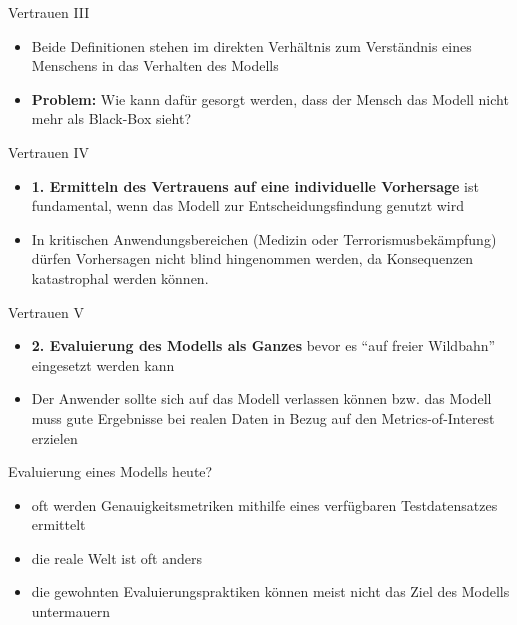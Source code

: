 \documentclass{beamer}
\begin{document}
  \begin{frame}{Vertrauen III}
    \begin{itemize}
      \item Beide Definitionen stehen im direkten Verhältnis zum Verständnis eines Menschens in das Verhalten des Modells
      \item \textbf{Problem:} Wie kann dafür gesorgt werden, dass der Mensch das Modell nicht mehr als Black-Box sieht?
    \end{itemize}
  \end{frame}

  \begin{frame}{Vertrauen IV}
    \begin{itemize}
      \item \textbf{1. Ermitteln des Vertrauens auf eine individuelle Vorhersage} ist fundamental, wenn das Modell zur Entscheidungsfindung genutzt wird
      \item In kritischen Anwendungsbereichen (Medizin oder Terrorismusbekämpfung) dürfen Vorhersagen nicht blind hingenommen werden, da Konsequenzen katastrophal werden können.
    \end{itemize}
  \end{frame}

  \begin{frame}{Vertrauen V}
    \begin{itemize}
      \item \textbf{2. Evaluierung des Modells als Ganzes} bevor es "`auf freier Wildbahn"' eingesetzt werden kann
      \item Der Anwender sollte sich auf das Modell verlassen können bzw. das Modell muss gute Ergebnisse bei realen Daten in Bezug auf den Metrics-of-Interest erzielen
    \end{itemize}
  \end{frame}

  \begin{frame}{Evaluierung eines Modells heute?}
    \begin{itemize}
      \item oft werden Genauigkeitsmetriken mithilfe eines verfügbaren Testdatensatzes ermittelt
      \item die reale Welt ist oft anders
      \item die gewohnten Evaluierungspraktiken können meist nicht das Ziel des Modells untermauern
    \end{itemize}
  \end{frame}
\end{document}
